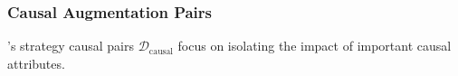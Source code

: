 



\subsubsection{Causal Augmentation Pairs}
\carma{}'s strategy causal pairs $\mathcal{D}_{\mathrm{causal}}$ focus on isolating the impact of important causal attributes.




\vspace{-0.1in}
